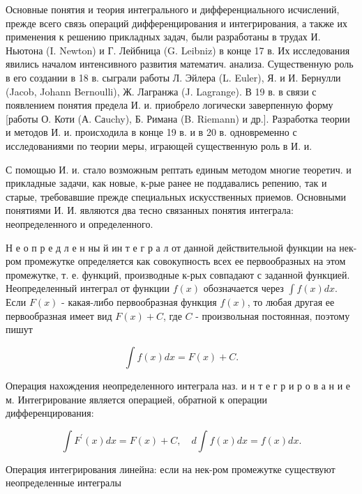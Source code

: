 \documentclass[10pt]{article}
\begin{document}
Основные понятия и теория интегрального и дифференциального исчислений, прежде всего связь операций дифференцирования и интегрирования, а также их применения к решению прикладных задач, были разработаны в трудах И. Ньютона (I. Newton) и Г. Лейбница (G. Leibniz) в конце 17 в. Их исследования явились началом интенсивного развития математич. анализа. Существенную роль в его создании в 18 в. сыграли работы Л. Эйлера (L. Euler), Я. и И. Бернулли (Jacob, Johann Bernoulli), Ж. Лагранжа (J. Lagrange). В 19 в. в связи с появлением понятия предела И. и. приобрело логически заверпенную форму [работы О. Коти (А. Саuchy), Б. Римана (B. Riemann) и др.]. Разработка теории и методов И. и. происходила в конце 19 в. и в 20 в. одновременно с исследованиями по теории меры, играющей существенную роль в И. и.



С помощью И. и. стало возможным рептать единым методом многие теоретич. и прикладные задачи, как новые, к-рые ранее не поддавались репению, так и старые, требовавшие прежде специальных искусственных приемов. Основными понятиями И. И. являются два тесно связанных понятия интеграла: неопределенного и определенного.



Н е о п р е д л е н ны й ин т е г р а л от данной действительной функции на нек-ром промежутке определяется как совокупность всех ее первообразных на этом промежутке, т. е. функций, производные к-рых совпадают с заданной функцией. Неопределенный интеграл от функции $f(x)$ обозначается через $\int f(x) d x$. Если $F(x)$ - какая-либо первообразная функция $f(x)$, то любая другая ее первообразная имеет вид $F(x)+C$, где $C$ - произвольная постоянная, поэтому пишут



\[

\int f(x) d x=F(x)+C .

\]



Операция нахождения неопределенного интеграла наз. и н т е г р и р о в а н и е м. Интегрирование является операцией, обратной к операции дифференцирования:



\[

\int F^{\prime}(x) d x=F(x)+C, \quad d \int f(x) d x=f(x) d x .

\]



Операция интегрирования линейна: если на нек-ром промежутке существуют неопределенные интегралы
\end{document}
